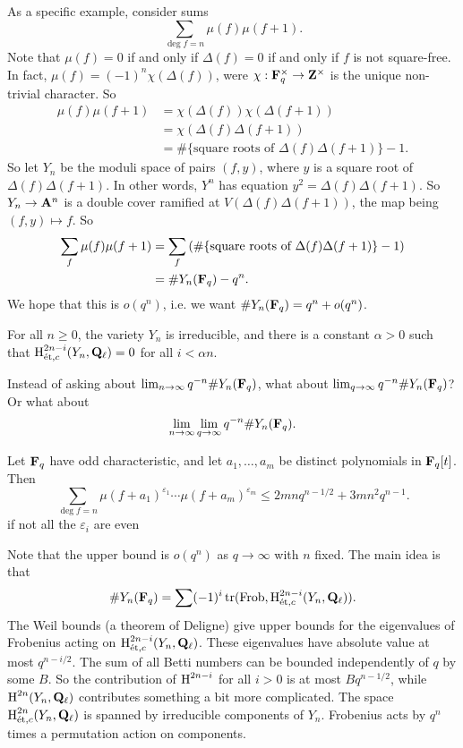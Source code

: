 As a specific example, consider sums 
\[
  \sum_{\deg f=n} \mu(f)\mu(f+1) .
\]
Note that $\mu(f)=0$ if and only if $\Delta(f)=0$ if and only if $f$ is not 
square-free. In fact, $\mu(f) = (-1)^n \chi(\Delta(f))$, were 
$\chi:\mathbf{F}_q^\times \to \mathbf{Z}^\times$ is the unique non-trivial character. So 
\begin{align*}
  \mu(f) \mu(f+1) 
    &= \chi(\Delta(f))\chi(\Delta(f+1)) \\
    &= \chi(\Delta(f)\Delta(f+1)) \\
    &= \#\{\text{square roots of $\Delta(f)\Delta(f+1)$}\} - 1.
\end{align*}
So let $Y_n$ be the moduli space of pairs $(f,y)$, where $y$ is a square root 
of $\Delta(f)\Delta(f+1)$. In other words, $Y^n$ has equation 
$y^2=\Delta(f)\Delta(f+1)$. So $Y_n \to \mathbf{A}^n$ is a double cover ramified at 
$V(\Delta(f)\Delta(f+1))$, the map being $(f,y)\mapsto f$. So 
\begin{align*}
  \sum_f \mu(f)\mu(f+1) 
    &= \sum_f \left(\#\{\text{square roots of $\Delta(f)\Delta(f+1)$}\} - 1\right) \\
    &= \# Y_n(\mathbf{F}_q) - q^n .
\end{align*}
We hope that this is $o(q^n)$, i.e. we want 
$\# Y_n(\mathbf{F}_q) = q^n + o(q^n)$. 

\begin{conjecture}
For all $n\geq 0$, the variety $Y_n$ is irreducible, and there is a constant 
$\alpha>0$ such that $\operatorname{H}_{\textnormal{\'et},c}^{2n-i}(Y_n,\mathbf{Q}_\ell) = 0$ for all 
$i<\alpha n$. 
\end{conjecture}

Instead of asking about $\lim_{n\to \infty} q^{-n} \# Y_n(\mathbf{F}_q)$, what about 
$\lim_{q\to \infty} q^{-n} \# Y_n(\mathbf{F}_q)$? Or what about 
\[
  \lim_{n\to \infty} \lim_{q\to \infty} q^{-n} \# Y_n(\mathbf{F}_q) .
\]

\begin{theorem}
Let $\mathbf{F}_q$ have odd characteristic, and let $a_1,\dots,a_m$ be distinct 
polynomials in $\mathbf{F}_q[t]$. Then 
\[
  \sum_{\deg f=n} \mu(f+a_1)^{\varepsilon_1} \cdots \mu(f+a_m)^{\varepsilon_m} \leq 2 m n q^{n-1/2} + 3 m n^2 q^{n-1} .
\]
if not all the $\varepsilon_i$ are even 
\end{theorem}
Note that the upper bound is $o(q^n)$ as $q\to \infty$ with $n$ fixed. The main 
idea is that 
\[
  \# Y_n(\mathbf{F}_q) = \sum (-1)^i \operatorname{tr}( \operatorname{Frob},\operatorname{H}_{\textnormal{\'et},c}^{2n-i}(Y_n,\mathbf{Q}_\ell)) .
\]
The Weil bounds (a theorem of Deligne) give upper bounds for the eigenvalues 
of Frobenius acting on $\operatorname{H}_{\textnormal{\'et},c}^{2n-i}(Y_n,\mathbf{Q}_\ell)$. These eigenvalues 
have absolute value at most $q^{n-i/2}$. The sum of all Betti numbers can 
be bounded independently of $q$ by some $B$. So the contribution of 
$\operatorname{H}^{2n-i}$ for all $i>0$ is at most $B q^{n-1/2}$, while 
$\operatorname{H}^{2n}(Y_n,\mathbf{Q}_\ell)$ contributes something a bit more complicated. 
The space $\operatorname{H}^{2n}_{\textnormal{\'et},c}(Y_n,\mathbf{Q}_\ell)$ is spanned by irreducible 
components of $Y_n$. Frobenius acts by $q^n$ times a permutation action on 
components. 

